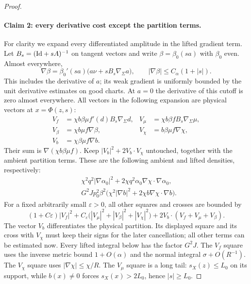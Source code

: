 \begin{proof}
\paragraph{Claim 2: every derivative cost except the partition terms.}
For clarity we expand every differentiated amplitude in the lifted
gradient term.  Let $B_s=(\mathrm{Id}+sA)^{-1}$ on tangent vectors and write
$\beta=\beta_0(sa)$ with $\beta_0$ even.  Almost everywhere,
\[
 \nabla\beta=\beta_0'(sa)
       \bigl(a\nu+sB_s\nabla_\Sigma a\bigr),
 \qquad |\nabla\beta|\le C_\alpha(1+|s|).
\]
This includes the derivative of $a$; its weak gradient is uniformly
bounded by the unit derivative estimates on good charts.  At $a=0$
the derivative of this cutoff is zero almost everywhere.
All vectors in the following expansion are physical vectors at
$x=\Phi(z,s)$:
\[
 \begin{aligned}
 V_f&=\chi b\beta\mu f'(d)B_s\nabla_\Sigma d,&
 V_\mu&=\chi b\beta f B_s\nabla_\Sigma\mu,\\
 V_\beta&=\chi b\mu f\nabla\beta,&
 V_\chi&=b\beta\mu f\nabla\chi,\\
 V_b&=\chi\beta\mu f\nabla b.&
 \end{aligned}
\]
Their sum is $\nabla(\chi b\beta\mu f)$.
Keep $|V_b|^2+2V_b\cdot V_\chi$ untouched, together with the ambient
partition terms.  These are the following ambient and lifted
densities, respectively:
\begin{equation}\label{eq:M4}
 \begin{split}
 &\chi^2q^2|\nabla\alpha_0|^2
      +2\chi q^2\alpha_0\nabla\chi\cdot\nabla\alpha_0,\\
 &G^2Jp_0^2\beta^2
   \bigl(\chi^2|\nabla b|^2+2\chi b\nabla\chi\cdot\nabla b\bigr).
 \end{split}
\end{equation}
For a fixed arbitrarily small $\varepsilon>0$, all other squares and
crosses are bounded by
\[
 (1+C\varepsilon)|V_f|^2
 +C_\varepsilon\bigl(|V_\mu|^2+|V_\beta|^2+|V_\chi|^2\bigr)
 +2V_b\cdot(V_f+V_\mu+V_\beta).
\]
The vector $V_b$ differentiates the physical partition.  Its displayed
square and its cross with $V_\chi$ must keep their signs for the later
cancellation; all other terms can be estimated now.  Every lifted
integral below has the factor $G^2J$.
The $V_f$ square uses the inverse metric bound $1+O(\alpha)$ and the
normal integral $\sigma+O(R^{-1})$.  The $V_\chi$ square uses
$|\nabla\chi|\le\chi/R$.  The $V_\mu$ square is a long tail:
$s_X(z)\le L_0$ on its support, while $b(x)\ne0$ forces
$s_X(x)>2L_0$, hence $|s|\ge L_0$.


\end{proof}
